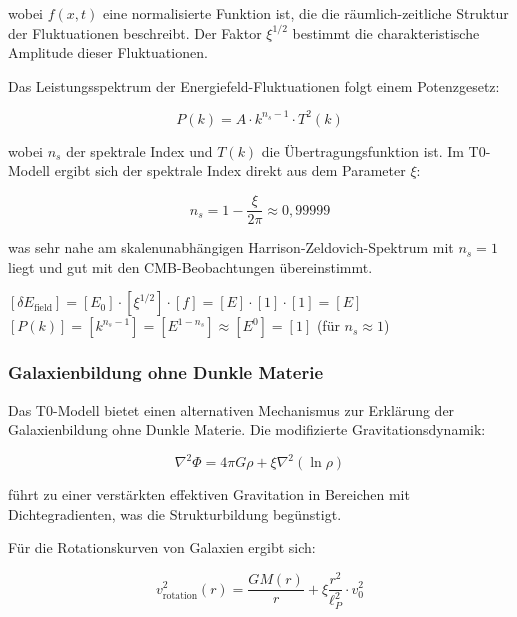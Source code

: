 \documentclass[12pt,a4paper]{article}
\theoremstyle{definition}
\begin{document}
wobei $f(x,t)$ eine normalisierte Funktion ist, die die räumlich-zeitliche Struktur der Fluktuationen beschreibt. Der Faktor $\xi^{1/2}$ bestimmt die charakteristische Amplitude dieser Fluktuationen.

Das Leistungsspektrum der Energiefeld-Fluktuationen folgt einem Potenzgesetz:

\begin{equation}
P(k) = A \cdot k^{n_s - 1} \cdot T^2(k)
\end{equation}

wobei $n_s$ der spektrale Index und $T(k)$ die Übertragungsfunktion ist. Im T0-Modell ergibt sich der spektrale Index direkt aus dem Parameter $\xi$:

\begin{equation}
n_s = 1 - \frac{\xi}{2\pi} \approx 0,99999
\end{equation}

was sehr nahe am skalenunabhängigen Harrison-Zeldovich-Spektrum mit $n_s = 1$ liegt und gut mit den CMB-Beobachtungen übereinstimmt.

\begin{einheitencheck}
$[\delta E_{\text{field}}] = [E_0] \cdot [\xi^{1/2}] \cdot [f] = [E] \cdot [1] \cdot [1] = [E]$ \checkmark\\
$[P(k)] = [k^{n_s-1}] = [E^{1-n_s}] \approx [E^{0}] = [1]$ (für $n_s \approx 1$) \checkmark
\end{einheitencheck}

\subsubsection{Galaxienbildung ohne Dunkle Materie}

Das T0-Modell bietet einen alternativen Mechanismus zur Erklärung der Galaxienbildung ohne Dunkle Materie. Die modifizierte Gravitationsdynamik:

\begin{equation}
\nabla^2 \Phi = 4\pi G \rho + \xi \nabla^2 \left( \ln \rho \right)
\end{equation}

führt zu einer verstärkten effektiven Gravitation in Bereichen mit Dichtegradienten, was die Strukturbildung begünstigt.

Für die Rotationskurven von Galaxien ergibt sich:

\begin{equation}
v_{\text{rotation}}^2(r) = \frac{GM(r)}{r} + \xi \frac{r^2}{\ell_P^2} \cdot v_0^2
\end{equation}
\end{document}
